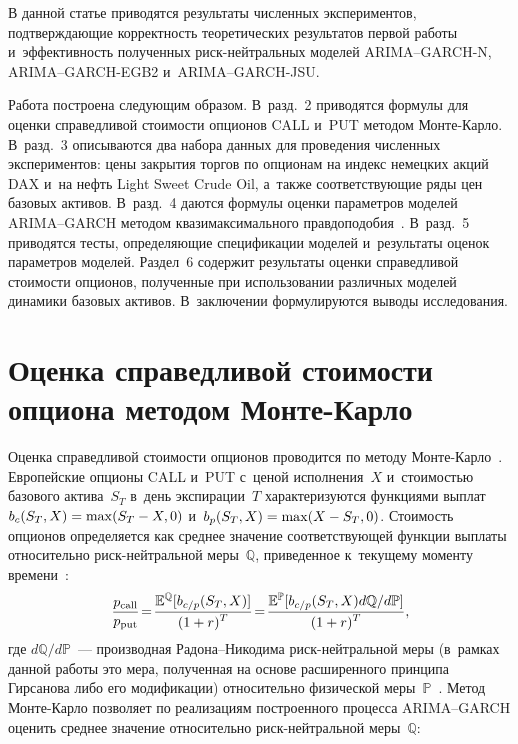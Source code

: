 \begin{multicols}{2}
  В данной статье приводятся результаты чис\-лен\-ных экспериментов, 
подтверждающие корректность теоретических результатов первой работы 
и~эффективность полученных риск-ней\-траль\-ных моделей  
ARIMA--GARCH-N, ARIMA--GARCH-EGB2 и~ARIMA--GARCH-JSU. 
  
  Работа построена следующим образом. В~разд.~2 приводятся формулы для 
оценки справедливой стоимости опционов CALL и~PUT методом Мон\-те-Кар\-ло. 
В~разд.~3 описываются два набора данных для проведения 
численных экспериментов: цены закрытия торгов по опционам на индекс 
немецких акций DAX и~на нефть Light Sweet Crude Oil, а~также 
соответствующие ряды цен базовых активов. В~разд.~4 даются формулы 
оценки параметров моделей ARIMA--GARCH методом квазимаксимального 
правдоподобия~\cite{8-dan}. В~разд.~5 приводятся тесты, определяющие 
спецификации моделей и~результаты оценок параметров моделей. Раздел~6 
содержит результаты оценки справедливой стоимости опционов, полученные 
при использовании различных моделей динамики базовых активов. 
В~заключении формулируются выводы исследования.

\vspace*{-6pt}

\section{Оценка справедливой стоимости опциона методом  
Монте-Карло}

\vspace*{-3pt}

  Оценка справедливой стоимости опционов проводится по методу Мон\-те-Кар\-ло~\cite{9-dan}. 
  Европейские опционы CALL и~PUT с~ценой 
исполнения~$X$ и~стоимостью базового актива~$S_T$ в~день 
экспирации~$T$ характеризуются функциями выплат $b_c (S_T,X)\hm= \max 
(S_T\hm - X,0)$ и~$b_p(S_T, X)\hm= \max (X\hm- S_T,0)$. Стоимость опционов 
определяется как среднее значение соответствующей функции выплаты 
относительно риск-ней\-траль\-ной меры~$\mathbb{Q}$, приведенное 
к~текущему моменту времени~\cite{10-dan}:
  \begin{equation}
\! \displaystyle\frac{\displaystyle p_{\mathrm{call}}\mathstrut}{\displaystyle p_{\mathrm{put}}\mathstrut} \!=\!\displaystyle\frac{\displaystyle \mathbb{E}^{\mathbb{Q}} [b_{c/p}(S_T,X)]\mathstrut}{\displaystyle (1+r)^T\mathstrut} 
\!=\! \displaystyle\frac{\displaystyle \mathbb{E}^{\mathbb{P}} [b_{c/p}(S_T,X)d\mathbb{Q}/d\mathbb{P}]\mathstrut}{\displaystyle (1+r)^T\mathstrut},\!\!
  \label{e6-dan}
  \end{equation}
где $d\mathbb{Q}/d\mathbb{P}$~--- производная Ра\-до\-на--Ни\-ко\-ди\-ма  
риск-ней\-т\-раль\-ной меры (в~рамках данной работы это мера, полученная на 
основе расширенного принципа Гирсанова либо его модификации) 
относительно физической меры~$\mathbb{P}$~\cite{11-dan, 12-dan}. Метод 
Мон\-те-Кар\-ло позволяет по реализациям построенного процесса ARIMA--GARCH 
оценить среднее значение относительно  
риск-ней\-т\-раль\-ной меры~$\mathbb{Q}$:
\vspace*{-6pt}


\end{multicols}
